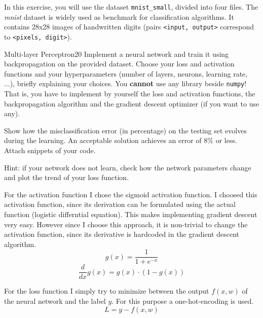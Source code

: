 \newif\ifvimbug
\vimbugfalse

\ifvimbug

\fi

In this exercise, you will use the dataset \texttt{mnist\_small}, divided into four files. The \textit{mnist} dataset is widely used as benchmark for classification algorithms. It contains 28x28 images of handwritten digits (pairs \texttt{<input, output>} correspond to \texttt{<pixels, digit>}).

\begin{questions}


\begin{question}{Multi-layer Perceptron}{20}
Implement a neural network and train it using backpropagation on the provided dataset. Choose your loss and activation functions and your hyperparameters (number of layers, neurons, learning rate, ...), briefly explaining your choices. You \textbf{cannot} use any library beside \texttt{numpy}! That is, you have to implement by yourself the loss and activation functions, the backpropagation algorithm and the gradient descent optimizer (if you want to use any).

Show how the misclassification error (in percentage) on the testing set evolves during the learning. An acceptable solution achieves an error of 8\% or less. Attach snippets of your code. 

Hint: if your network does not learn, check how the network parameters change and plot the trend of your loss function.

\begin{answer}
For the activation function I chose the sigmoid activation function. I choosed this activation function, since its derivation can be formulated using the actual function (logistic differntial equation). This makes implementing gradient descent very easy. However since I choose this approach, it is non-trivial to change the activation function, since its derivative is hardcoded in the gradient descent algorithm.
\begin{equation}
	g(x)=\frac{1}{1+e^{-x}}
\end{equation} 
\begin{equation}
	\frac{d}{dx}g(x)=g(x)\cdot (1-g(x))
\end{equation}

For the loss function I simply try to minimize between the output $f(x,w)$ of the neural network and the label $y$. For this purpose a one-hot-encoding is used. 
\begin{equation}
	L=y-f(x,w)
\end{equation}


\end{answer}
\end{question}
\end{questions}
